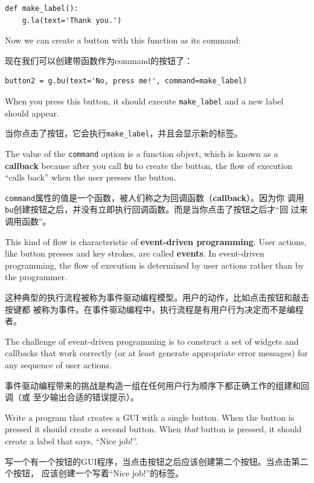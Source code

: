 \documentclass[10pt]{book}
\begin{document}
\begin{CJK}{UTF8}{gbsn}
\begin{verbatim}
def make_label():
    g.la(text='Thank you.')
\end{verbatim}
%
Now we can create a button with this function as its command:

现在我们可以创建带函数作为command的按钮了：

\begin{verbatim}
button2 = g.bu(text='No, press me!', command=make_label)
\end{verbatim}
%
When you press this button, it should execute \verb"make_label"
and a new label should appear.

当你点击了按钮，它会执行\verb"make_label"，并且会显示新的标签。

The value of the {\tt command} option
is a function object, which is known as a {\bf callback} because
after you call {\tt bu} to create the button, the flow of execution
``calls back'' when the user presses the button.

{\tt command}属性的值是一个函数，被人们称之为回调函数（{\bf callback}）。因为你
调用{\tt bu}创建按钮之后，并没有立即执行回调函数。而是当你点击了按钮之后才``回
过来调用函数''。

This kind of flow is characteristic of {\bf event-driven programming}.
User actions, like button presses and key strokes, are called {\bf
events}.  In event-driven programming, the flow of execution is
determined by user actions rather than by the programmer.  

这种典型的执行流程被称为事件驱动编程模型。用户的动作，比如点击按钮和敲击按键都
被称为事件。在事件驱动编程中，执行流程是有用户行为决定而不是编程者。

The challenge of event-driven programming is to construct a set of
widgets and callbacks that work correctly (or at least generate
appropriate error messages) for any sequence of user actions.

事件驱动编程带来的挑战是构造一组在任何用户行为顺序下都正确工作的组建和回调（或
至少输出合适的错误提示）。

\begin{exercise}

Write a program that creates a GUI with a single button.  When the
button is pressed it should create a second button.  When
{\em that} button is pressed, it should create a label that
says, ``Nice job!''.

写一个有一个按钮的GUI程序，当点击按钮之后应该创建第二个按钮。当点击第二个按钮，
应该创建一个写着``Nice job!''的标签。


\end{exercise}
\end{CJK}
\end{document}
